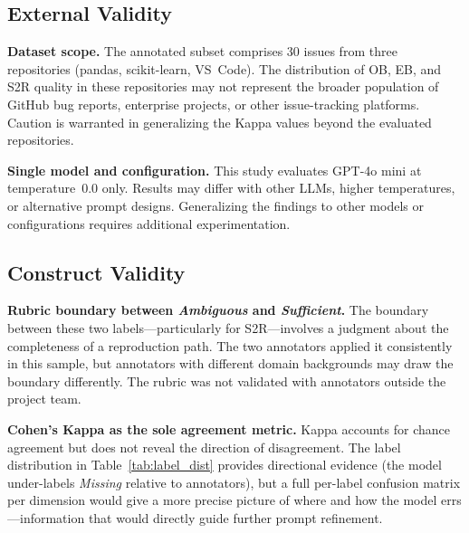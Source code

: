 \subsection{External Validity}

\textbf{Dataset scope.}
The annotated subset comprises 30 issues from three repositories
(pandas, scikit-learn, VS~Code).  The distribution of OB, EB, and S2R
quality in these repositories may not represent the broader population
of GitHub bug reports, enterprise projects, or other issue-tracking
platforms.  Caution is warranted in generalizing the Kappa values
beyond the evaluated repositories.

\textbf{Single model and configuration.}
This study evaluates GPT-4o mini at temperature~$0.0$ only.  Results
may differ with other LLMs, higher temperatures, or alternative prompt
designs.  Generalizing the findings to other models or configurations
requires additional experimentation.

\subsection{Construct Validity}

\textbf{Rubric boundary between \textit{Ambiguous} and
\textit{Sufficient}.}
The boundary between these two labels---particularly for S2R---involves
a judgment about the completeness of a reproduction path.  The two
annotators applied it consistently in this sample, but annotators with
different domain backgrounds may draw the boundary differently.  The
rubric was not validated with annotators outside the project team.

\textbf{Cohen's Kappa as the sole agreement metric.}
Kappa accounts for chance agreement but does not reveal the direction
of disagreement.  The label distribution in
Table~\ref{tab:label_dist} provides directional evidence (the model
under-labels \textit{Missing} relative to annotators), but a full
per-label confusion matrix per dimension would give a more precise
picture of where and how the model errs---information that would
directly guide further prompt refinement.
